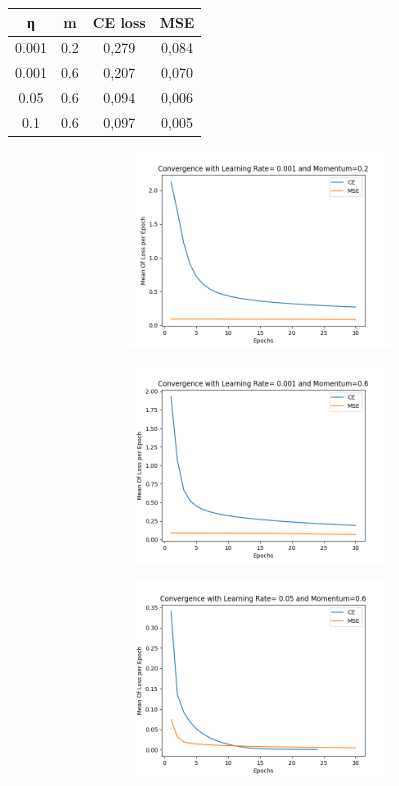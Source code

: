 \documentclass[12pt,a4paper]{article}
\newcommand{\tl}{\textlatin}
\begin{document}
        \begin{table}[h]
            \centering
            \begin{tabular}{|c | c | c |c | }
                \hline
                η & \tl{m} & \tl{CE loss} & \tl{MSE} \\
                \hline
                0.001 & 0.2 & 0,279 & 0,084 \\ 
                0.001 & 0.6 & 0,207 & 0,070 \\ 
                0.05  & 0.6 & 0,094 & 0,006 \\ 
                0.1   & 0.6 & 0,097 & 0,005 \\
                \hline 
            \end{tabular} 
        \end{table}
        \begin{figure}[H]
            \raggedright
                \begin{subfigure}[t]{0.5\textwidth}
                    \includegraphics[width=10cm,height=5.2cm,left]{images/0.001_0.2.png}
                \end{subfigure}
                \begin{subfigure}[t]{0.5\textwidth}
                    \includegraphics[width=10cm,height=5.2cm,left]{images/0.001_0.6.png}
                \end{subfigure}
                \begin{subfigure}[t]{0.5\textwidth}
                    \includegraphics[width=10cm,height=5.2cm,left]{images/0.05_0.6.png}
                \end{subfigure}
        \end{figure}
\end{document}

